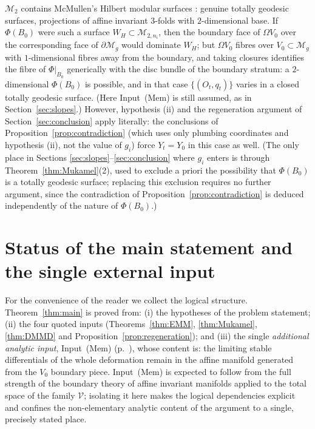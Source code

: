 \documentclass[11pt]{article}
\newcommand{\M}{\mathcal{M}}
\theoremstyle{definition}
\theoremstyle{remark}
\begin{document}
\begin{description}[style=nextline]
\item[Genus two: $g_i = 2$, $n_i \ge 0$.]
$\M_2$ contains McMullen's Hilbert modular surfaces
\cite{McMullenHMS}: genuine totally geodesic surfaces, projections of
affine invariant $3$-folds with $2$-dimensional base. If
$\Phi(B_0)$ were such a surface $W_H \subset \M_{2,n_i}$, then the
boundary face of $\Omega V_0$ over the corresponding face of
$\partial \M_g$ would dominate $W_H$; but $\Omega V_0$ fibres over
$V_0 \subset \M_g$ with $1$-dimensional fibres away from the boundary,
and taking closures identifies the fibre of $\Phi|_{B_0}$ generically
with the disc bundle of the boundary stratum: a
$2$-dimensional $\Phi(B_0)$ is possible, and in that case
$\{(O_t,q_t)\}$ varies in a closed totally geodesic surface. (Here
Input~(Mem) is still assumed, as in Section~\ref{sec:slopes}.)
However, hypothesis (ii) and the regeneration argument of
Section~\ref{sec:conclusion} apply literally: the conclusions of
Proposition~\ref{prop:contradiction} (which uses only plumbing
coordinates and hypothesis (ii), not the value of $g_i$) force $Y_t =
Y_0$ in this case as well. (The only place in Sections
\ref{sec:slopes}--\ref{sec:conclusion} where $g_i$ enters is through
Theorem~\ref{thm:Mukamel}(2), used to exclude a priori the possibility
that $\Phi(B_0)$ is a totally geodesic surface; replacing this
exclusion requires no further argument, since the contradiction of
Proposition~\ref{prop:contradiction} is deduced independently of the
nature of $\Phi(B_0)$.)
\end{description}

\section{Status of the main statement and the single external input}
\label{sec:status}

For the convenience of the reader we collect the logical structure.
Theorem~\ref{thm:main} is proved from: (i) the hypotheses of the problem
statement; (ii) the four quoted inputs
(Theorems~\ref{thm:EMM}, \ref{thm:Mukamel}, \ref{thm:DMMD} and
Proposition~\ref{prop:regeneration}); and (iii) the single
\emph{additional analytic input}, Input~(Mem)
(p.\ \pageref{input:membership}), whose content is: the limiting stable
differentials of the whole deformation remain in the affine manifold
generated from the $V_0$ boundary piece. Input~(Mem) is expected to
follow from the full strength of the boundary theory of affine invariant
manifolds applied to the total space of the family $\mathcal V$;
isolating it here makes the logical dependencies explicit and confines
the non-elementary analytic content of the argument to a single,
precisely stated place.
\end{document}
